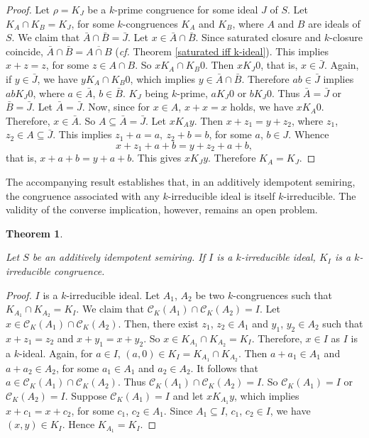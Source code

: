 \documentclass[11pt,english]{amsart}
\newtheorem{theorem}{Theorem}[section]
\theoremstyle{definition}
\numberwithin{equation}{section}
\begin{document}
 \begin{proof}
     Let $\rho=K_J$ be a $k$-prime congruence for some ideal $J$ of $S$. Let $K_A\cap K_B=K_J$, for some $k$-congruences $K_A$ and $K_B$, where $A$ and $B$ are ideals of $S$. We claim that $\bar{A}\cap\bar{B}=\bar{J}$. Let $x\in \bar{A}\cap \bar{B}$. Since saturated closure and $k$-closure coincide, $\bar{A}\cap \bar{B}=\overline{A\cap B}$ (\textit{cf.} Theorem \ref{saturated iff k-ideal}). This implies $x+z=z$, for some $z\in A\cap B$. So $xK_A\cap K_B0$. Then $xK_J0$, that is, $x\in \bar{J}$. Again, if $y\in \bar{J}$, we have $yK_A\cap K_B0$, which implies $y\in \bar{A}\cap \bar{B}$. Therefore $ab\in \bar{J}$ implies $abK_J0$, where $a\in \bar{A}$, $b\in \bar{B}$. $K_J$ being $k$-prime, $aK_J0$ or $bK_J0$. Thus $\bar{A}=\bar{J}$ or $\bar{B}=\bar{J}$. Let $\bar{A}=\bar{J}$. Now, since for $x\in A$, $x+x=x$ holds, we have $xK_A0$. Therefore, $x\in \bar{A}$. So $A\subseteq \bar{A}=\bar{J}$. Let $xK_Ay$. Then $x+z_1=y+z_2$, where $z_1$, $z_2\in A\subseteq\bar{J}$. This implies $z_1+a=a,\ z_2+b=b$, for some $a$, $b\in J$. Whence \[x+z_1+a+b=y+z_2+a+b,\] that is, $x+a+b=y+a+b$. This gives $xK_Jy$. Therefore $K_A=K_J$.
 \end{proof}

 The accompanying result establishes that, in an additively idempotent semiring, the congruence associated with any $k$-irreducible ideal is itself $k$-irreducible. The validity of the converse implication, however, remains an open problem.
 \begin{theorem}\label{k-irreducible ideal to k-irreducible congruence}
     
     Let $S$ be an additively idempotent semiring. If $I$ is a $k$-irreducible ideal, $K_I$ is a $k$-irreducible congruence.
 \end{theorem}
 
 \begin{proof}
     $I$ is a $k$-irreducible ideal. Let $A_1$, $A_2$ be two $k$-congruences such that $K_{A_1}\cap K_{A_2}=K_I$. We claim that $\mathcal{C}_K(A_1)\cap \mathcal{C}_K(A_2)=I$. Let $x\in \mathcal{C}_K(A_1)\cap \mathcal{C}_K(A_2)$. Then, there exist $z_1$, $z_2\in A_1$ and $y_1$, $y_2\in A_2$ such that $x+z_1=z_2$ and $x+y_1=x+y_2$. So $x\in K_{A_1}\cap K_{A_2}=K_I$. Therefore, $x\in I$ as $I$ is a $k$-ideal. Again, for $a\in I$, $(a,0)\in K_I=K_{A_1}\cap K_{A_2}$. Then $a+a_1\in A_1$ and $a+a_2\in A_2$, for some $a_1\in A_1$ and $a_2\in A_2$. It follows that $a\in \mathcal{C}_K(A_1)\cap \mathcal{C}_K(A_2)$. Thus $\mathcal{C}_K(A_1)\cap \mathcal{C}_K(A_2)=I$. So $\mathcal{C}_K(A_1)=I$ or $\mathcal{C}_K(A_2)=I$. Suppose $\mathcal{C}_K(A_1)=I$ and let $xK_{A_1}y$, which implies $x+c_1=x+c_2$, for some $c_1$, $c_2\in A_1$. Since $A_1\subseteq I$, $c_1$, $c_2\in I$, we have $(x,y)\in K_I$. Hence $K_{A_1}=K_I$.
 \end{proof}
 
\end{document}
